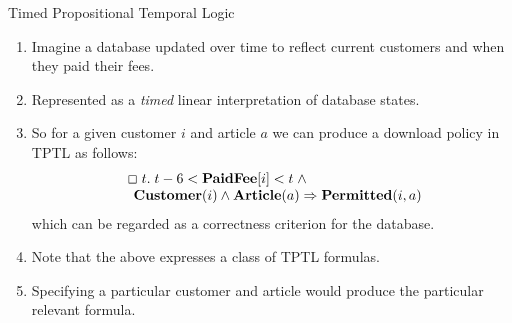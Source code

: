 \begin{wideslide}[bm=,toc=]{Timed Propositional Temporal Logic}
\begin{enumerate}
\item Imagine a database updated over time to reflect current customers and when they paid their fees.
\item<2-> Represented as a {\em timed\/} linear interpretation of database states.
\item<3-> So for a given customer $i$ and article $a$ we can produce a download
policy in TPTL as follows:
\pause[3]
\begin{displaymath}
\begin{array}{l}
\>\> \Box\; t.\;t - 6 < \mbox{\bf PaidFee}[i] < t\; \wedge \\
\>\>\>\>\mbox{\bf Customer}(i) \wedge \mbox{\bf Article}(a) \Rightarrow
\mbox{\bf Permitted}(i,a)
\end{array}
\end{displaymath}
\pause
which can be regarded as a correctness criterion for the database.
\item<4-> Note that the above expresses a class of TPTL formulas.
\item<5-> Specifying a particular customer and article would produce the
particular relevant formula.
\end{enumerate}
\end{wideslide}
